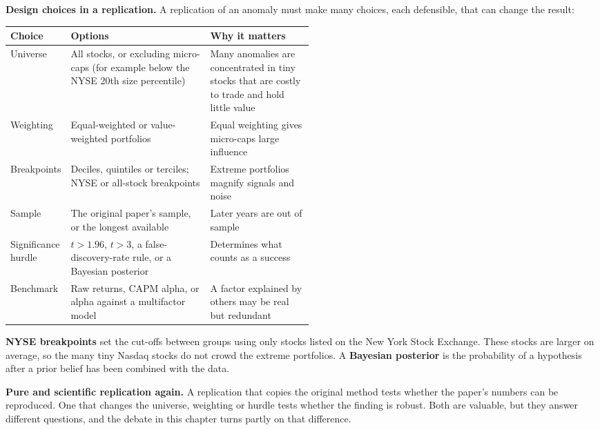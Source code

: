 \textbf{Design choices in a replication.} A replication of an anomaly must make many choices, each defensible, that can change the result:

\begin{center}
\small
\begin{tabularx}{0.9\linewidth}{@{}>{\raggedright\arraybackslash}p{0.17\linewidth}>{\raggedright\arraybackslash}X>{\raggedright\arraybackslash}p{0.34\linewidth}@{}}
\toprule
Choice & Options & Why it matters \\
\midrule
Universe & All stocks, or excluding micro-caps (for example below the NYSE 20th size percentile) & Many anomalies are concentrated in tiny stocks that are costly to trade and hold little value \\
Weighting & Equal-weighted or value-weighted portfolios & Equal weighting gives micro-caps large influence \\
Breakpoints & Deciles, quintiles or terciles; NYSE or all-stock breakpoints & Extreme portfolios magnify signals and noise \\
Sample & The original paper's sample, or the longest available & Later years are out of sample \\
Significance hurdle & $t > 1.96$, $t > 3$, a false-discovery-rate rule, or a Bayesian posterior & Determines what counts as a success \\
Benchmark & Raw returns, CAPM alpha, or alpha against a multifactor model & A factor explained by others may be real but redundant \\
\bottomrule
\end{tabularx}
\end{center}

\textbf{NYSE breakpoints} set the cut-offs between groups using only stocks listed on the New York Stock Exchange. These stocks are larger on average, so the many tiny Nasdaq stocks do not crowd the extreme portfolios. A \textbf{Bayesian posterior} is the probability of a hypothesis after a prior belief has been combined with the data.

\textbf{Pure and scientific replication again.} A replication that copies the original method tests whether the paper's numbers can be reproduced. One that changes the universe, weighting or hurdle tests whether the finding is robust. Both are valuable, but they answer different questions, and the debate in this chapter turns partly on that difference.

